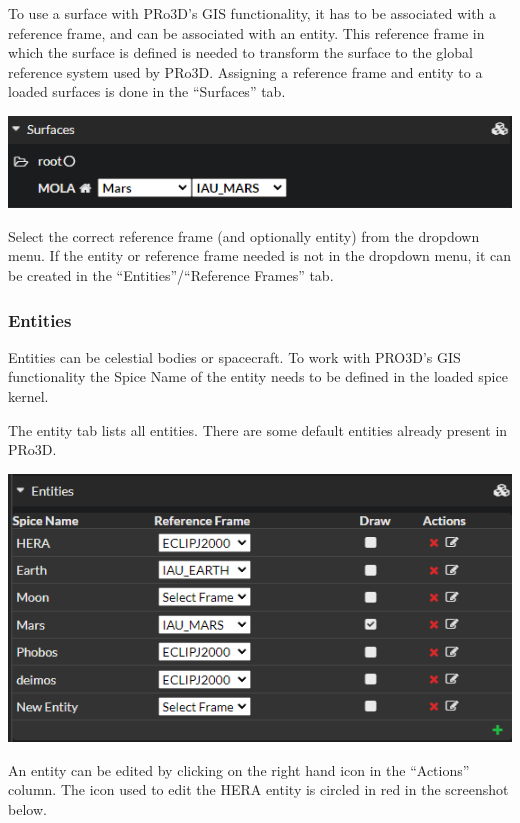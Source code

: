 To use a surface with PRo3D's GIS functionality, it has to be associated
with a reference frame, and can be associated with an entity. This
reference frame in which the surface is defined is needed to transform
the surface to the global reference system used by PRo3D. Assigning a
reference frame and entity to a loaded surfaces is done in the
``Surfaces'' tab.

\includegraphics{images/surfaces.png}

Select the correct reference frame (and optionally entity) from the
dropdown menu. If the entity or reference frame needed is not in the
dropdown menu, it can be created in the ``Entities''/``Reference
Frames'' tab.

\hypertarget{entities}{%
\subsubsection{Entities}\label{entities}}

Entities can be celestial bodies or spacecraft. To work with PRO3D's GIS
functionality the Spice Name of the entity needs to be defined in the
loaded spice kernel.

The entity tab lists all entities. There are some default entities
already present in PRo3D.

\includegraphics{images/entities.png}

An entity can be edited by clicking on the right hand icon in the
``Actions'' column. The icon used to edit the HERA entity is circled in
red in the screenshot below.


